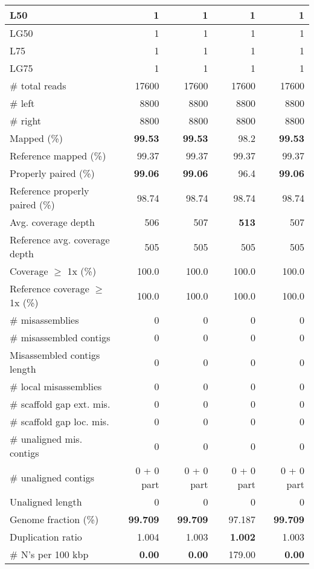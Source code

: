 \documentclass[12pt,a4paper]{article}
\begin{document}
\begin{table}[ht]
\begin{center}
\begin{tabular}{|l*{4}{|r}|}
L50 & 1 & 1 & 1 & 1 \\ \hline
LG50 & 1 & 1 & 1 & 1 \\ \hline
L75 & 1 & 1 & 1 & 1 \\ \hline
LG75 & 1 & 1 & 1 & 1 \\ \hline
\# total reads & 17600 & 17600 & 17600 & 17600 \\ \hline
\# left & 8800 & 8800 & 8800 & 8800 \\ \hline
\# right & 8800 & 8800 & 8800 & 8800 \\ \hline
Mapped (\%) & {\bf 99.53} & {\bf 99.53} & 98.2 & {\bf 99.53} \\ \hline
Reference mapped (\%) & 99.37 & 99.37 & 99.37 & 99.37 \\ \hline
Properly paired (\%) & {\bf 99.06} & {\bf 99.06} & 96.4 & {\bf 99.06} \\ \hline
Reference properly paired (\%) & 98.74 & 98.74 & 98.74 & 98.74 \\ \hline
Avg. coverage depth & 506 & 507 & {\bf 513} & 507 \\ \hline
Reference avg. coverage depth & 505 & 505 & 505 & 505 \\ \hline
Coverage $\geq$ 1x (\%) & 100.0 & 100.0 & 100.0 & 100.0 \\ \hline
Reference coverage $\geq$ 1x (\%) & 100.0 & 100.0 & 100.0 & 100.0 \\ \hline
\# misassemblies & 0 & 0 & 0 & 0 \\ \hline
\# misassembled contigs & 0 & 0 & 0 & 0 \\ \hline
Misassembled contigs length & 0 & 0 & 0 & 0 \\ \hline
\# local misassemblies & 0 & 0 & 0 & 0 \\ \hline
\# scaffold gap ext. mis. & 0 & 0 & 0 & 0 \\ \hline
\# scaffold gap loc. mis. & 0 & 0 & 0 & 0 \\ \hline
\# unaligned mis. contigs & 0 & 0 & 0 & 0 \\ \hline
\# unaligned contigs & 0 + 0 part & 0 + 0 part & 0 + 0 part & 0 + 0 part \\ \hline
Unaligned length & 0 & 0 & 0 & 0 \\ \hline
Genome fraction (\%) & {\bf 99.709} & {\bf 99.709} & 97.187 & {\bf 99.709} \\ \hline
Duplication ratio & 1.004 & 1.003 & {\bf 1.002} & 1.003 \\ \hline
\# N's per 100 kbp & {\bf 0.00} & {\bf 0.00} & 179.00 & {\bf 0.00} \\ \hline

\end{tabular}
\end{center}
\end{table}
\end{document}
